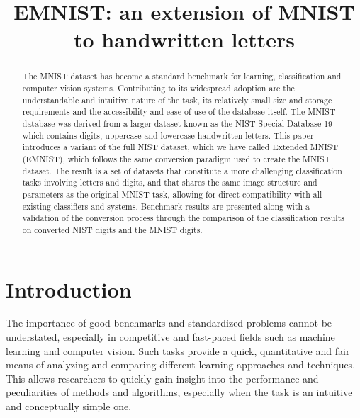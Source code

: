 \documentclass[conference]{IEEEtran}
\begin{document}
\title{EMNIST: an extension of MNIST to handwritten letters}

\author{
}

\maketitle

\begin{abstract}
The MNIST dataset has become a standard benchmark for learning, classification and computer vision systems. Contributing to its widespread adoption are the understandable and intuitive nature of the task, its relatively small size and storage requirements and the accessibility and ease-of-use of the database itself. The MNIST database was derived from a larger dataset known as the NIST Special Database 19 which contains digits, uppercase and lowercase handwritten letters. This paper introduces a variant of the full NIST dataset, which we have called Extended MNIST (EMNIST), which follows the same conversion paradigm used to create the MNIST dataset. The result is a set of datasets that constitute a more challenging classification tasks involving letters and digits, and that shares the same image structure and parameters as the original MNIST task, allowing for direct compatibility with all existing classifiers and systems. Benchmark results are presented along with a validation of the conversion process through the comparison of the classification results on converted NIST digits and the MNIST digits.
\end{abstract}



\IEEEpeerreviewmaketitle

\section{Introduction}
The importance of good benchmarks and standardized problems cannot be understated, especially in competitive and fast-paced fields such as machine learning and computer vision. Such tasks provide a quick, quantitative and fair means of analyzing and comparing different learning approaches and techniques. This allows researchers to quickly gain insight into the performance and peculiarities of methods and algorithms, especially when the task is an intuitive and conceptually simple one. 
\end{document}

